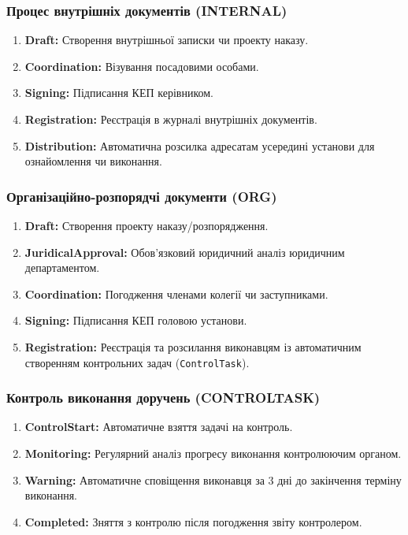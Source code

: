 \documentclass{article}
\begin{document}
\subsubsection{Процес внутрішніх документів (INTERNAL)}
\begin{enumerate}
    \item \textbf{Draft:} Створення внутрішньої записки чи проекту наказу.
    \item \textbf{Coordination:} Візування посадовими особами.
    \item \textbf{Signing:} Підписання КЕП керівником.
    \item \textbf{Registration:} Реєстрація в журналі внутрішніх документів.
    \item \textbf{Distribution:} Автоматична розсилка адресатам усередині установи для ознайомлення чи виконання.
\end{enumerate}

\subsubsection{Організаційно-розпорядчі документи (ORG)}
\begin{enumerate}
    \item \textbf{Draft:} Створення проекту наказу/розпорядження.
    \item \textbf{JuridicalApproval:} Обов'язковий юридичний аналіз юридичним департаментом.
    \item \textbf{Coordination:} Погодження членами колегії чи заступниками.
    \item \textbf{Signing:} Підписання КЕП головою установи.
    \item \textbf{Registration:} Реєстрація та розсилання виконавцям із автоматичним створенням контрольних задач (\texttt{ControlTask}).
\end{enumerate}

\subsubsection{Контроль виконання доручень (CONTROLTASK)}
\begin{enumerate}
    \item \textbf{ControlStart:} Автоматичне взяття задачі на контроль.
    \item \textbf{Monitoring:} Регулярний аналіз прогресу виконання контролюючим органом.
    \item \textbf{Warning:} Автоматичне сповіщення виконавця за 3 дні до закінчення терміну виконання.
    \item \textbf{Completed:} Зняття з контролю після погодження звіту контролером.
\end{enumerate}
\end{document}
